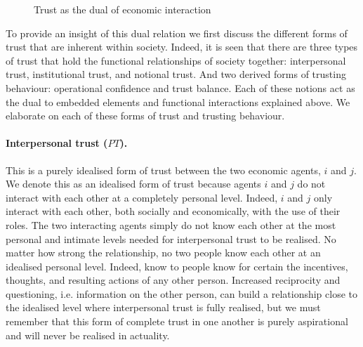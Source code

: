 \begin{subappendices}
\begin{figure}[t]
\begin{center}
\end{center}
\caption{Trust as the dual of economic interaction}
\label{dualityoftrust}
\end{figure}

To provide an insight of this dual relation we first discuss the different forms of trust that are inherent within society. Indeed, it is seen that there are three types of trust that hold the functional relationships of society together: interpersonal trust, institutional trust, and notional trust. And two derived forms of trusting behaviour: operational confidence and trust balance. Each of these notions act as the dual to embedded elements and functional interactions explained above. We elaborate on each of these forms of trust and trusting behaviour.

\paragraph{Interpersonal trust ($PT$).}

This is a purely idealised form of trust between the two economic agents, $i$ and $j$. We denote this as an idealised form of trust because agents $i$ and $j$ do not interact with each other at a completely personal level. Indeed, $i$ and $j$ only interact with each other, both socially and economically, with the use of their roles. The two interacting agents simply do not know each other at the most personal and intimate levels needed for interpersonal trust to be realised. No matter how strong the relationship, no two people know each other at an idealised personal level. Indeed, know to people know for certain the incentives, thoughts, and resulting actions of any other person. Increased reciprocity and questioning, i.e. information on the other person, can build a relationship close to the idealised level where interpersonal trust is fully realised, but we must remember that this form of complete trust in one another is purely aspirational and will never be realised in actuality.


\end{subappendices}
